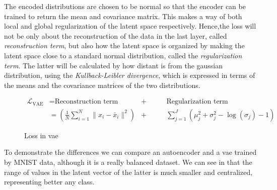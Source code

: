 \documentclass[11pt, a4paper]{article}
\begin{document}
	The encoded distributions are chosen to be normal so that the encoder can be trained to return the mean and covariance matrix. This makes a way of both local and global regularization of the latent space respectively. Hence,the loss will not be only about the reconstruction of the data in the last layer, called \textit{reconstruction term}, but also how the latent space is organized by making the latent space close to a standard normal distribution, called the \textit{regularization term}. The latter will be calculated by how distant is from the gaussian distribution, using the \textit{Kullback-Leibler divergence}, which is expressed in terms of the means and the covariance matrices of the two distributions.
	\begin{figure}[H]
		\begin{align*}
			\mathcal{L}_{\text{VAE}} &= \text{Reconstruction term} &+&\qquad \text{Regularization term}\\
			&= (\frac{1}{N} \sum_{i=1}^{N} \| x_i - \bar{x}_i \|^2) &+& \qquad \sum_{j=1}^{J} \left(\mu_j^2 + \sigma_j^2  - \log(\sigma_j)  - 1 \right)
		\end{align*}
		\caption{Loss in \gls{vae}}
	\end{figure}
	To demonstrate the differences we can compare an autoencoder and a \gls{vae} trained by MNIST data, although it is a really balanced dataset. We can see in  that the range of values in the latent vector of the latter is much smaller and centralized, representing better any class. %
\end{document}
